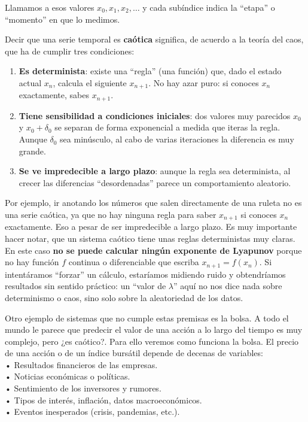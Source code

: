\documentclass[
  10pt,
  a4paper,
  DIV=11,
  numbers=noendperiod,
  open=any]{scrreprt}
\providecommand{\tightlist}{%
  \setlength{\itemsep}{0pt}\setlength{\parskip}{0pt}}
\numberwithin{equation}{chapter}
\numberwithin{equation}{section}
\renewcommand{\[}{\begin{equation}}
\renewcommand{\]}{\end{equation}}
\begin{document}
Llamamos a esos valores \(x_0, x_1, x_2, \dots\) y cada subíndice indica
la ``etapa'' o ``momento'' en que lo medimos.

Decir que una serie temporal es \textbf{caótica} significa, de acuerdo a
la teoría del caos, que ha de cumplir tres condiciones:

\begin{enumerate}
\def\labelenumi{\arabic{enumi}.}
\tightlist
\item
  \textbf{Es determinista}: existe una ``regla'' (una función) que, dado
  el estado actual \(x_n\), calcula el siguiente \(x_{n+1}\). No hay
  azar puro: si conoces \(x_n\) exactamente, sabes \(x_{n+1}\).\\
\item
  \textbf{Tiene sensibilidad a condiciones iniciales}: dos valores muy
  parecidos \(x_0\) y \(x_0 + \delta_0\) se separan de forma exponencial
  a medida que iteras la regla. Aunque \(\delta_0\) sea minúsculo, al
  cabo de varias iteraciones la diferencia es muy grande.\\
\item
  \textbf{Se ve impredecible a largo plazo}: aunque la regla sea
  determinista, al crecer las diferencias ``desordenadas'' parece un
  comportamiento aleatorio.
\end{enumerate}

Por ejemplo, ir anotando los números que salen directamente de una
ruleta no es una serie caótica, ya que no hay ninguna regla para saber
\(x_{n+1}\) si conoces \(x_n\) exactamente. Eso a pesar de ser
impredecible a largo plazo. Es muy importante hacer notar, que un
sistema caótico tiene unas reglas deterministas muy claras. En este caso
\textbf{no se puede calcular ningún exponente de Lyapunov} porque no hay
función \(f\) continua o diferenciable que escriba \(x_{n+1} = f(x_n)\).
Si intentáramos ``forzar'' un cálculo, estaríamos midiendo ruido y
obtendríamos resultados sin sentido práctico: un ``valor de
\(\lambda\)'' aquí no nos dice nada sobre determinismo o caos, sino solo
sobre la aleatoriedad de los datos.

Otro ejemplo de sistemas que no cumple estas premisas es la bolsa. A
todo el mundo le parece que predecir el valor de una acción a lo largo
del tiempo es muy complejo, pero ¿es caótico?. Para ello veremos como
funciona la bolsa. El precio de una acción o de un índice bursátil
depende de decenas de variables:\\
• Resultados financieros de las empresas.\\
• Noticias económicas o políticas.\\
• Sentimiento de los inversores y rumores.\\
• Tipos de interés, inflación, datos macroeconómicos.\\
• Eventos inesperados (crisis, pandemias, etc.).
\end{document}
